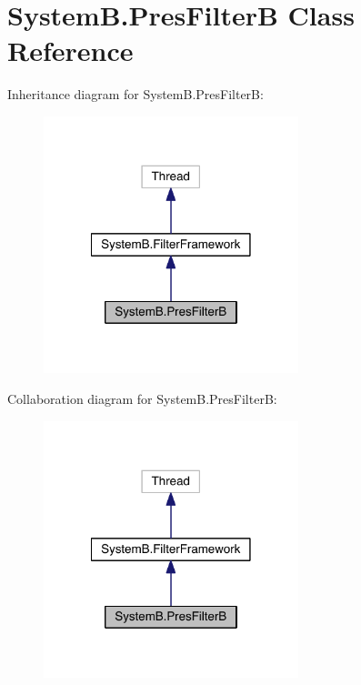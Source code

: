 \hypertarget{class_system_b_1_1_pres_filter_b}{}\section{System\+B.\+Pres\+Filter\+B Class Reference}
\label{class_system_b_1_1_pres_filter_b}


Inheritance diagram for System\+B.\+Pres\+Filter\+B\+:
\nopagebreak
\begin{figure}[H]
\begin{center}
\leavevmode
\includegraphics[width=210pt]{class_system_b_1_1_pres_filter_b__inherit__graph}
\end{center}
\end{figure}


Collaboration diagram for System\+B.\+Pres\+Filter\+B\+:
\nopagebreak
\begin{figure}[H]
\begin{center}
\leavevmode
\includegraphics[width=210pt]{class_system_b_1_1_pres_filter_b__coll__graph}
\end{center}
\end{figure}
